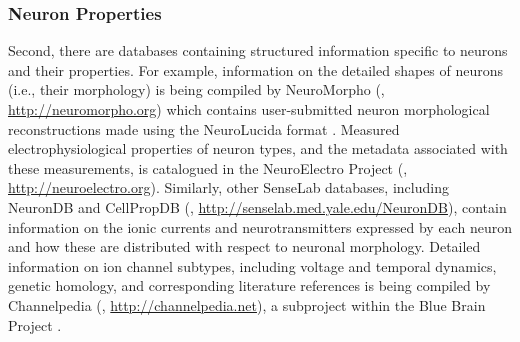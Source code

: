 \documentclass[12pt]{article}
\begin{document}
\subsubsection*{Neuron Properties}
Second, there are databases containing structured information specific to neurons and their properties. 
For example, information on the detailed shapes of neurons (i.e., their morphology) is being compiled by NeuroMorpho (\cite{neuromorpho_2007}, \url{http://neuromorpho.org}) which contains user-submitted neuron morphological reconstructions made using the NeuroLucida format \cite{glaser_neuron_1990}. 
Measured electrophysiological properties of neuron types, and the metadata associated with these measurements, is catalogued in the NeuroElectro Project (\cite{neuroelectro_2013}, \url{http://neuroelectro.org}).  
Similarly, other SenseLab databases, including NeuronDB and CellPropDB (\cite{crasto_senselab:_2007}, \url{http://senselab.med.yale.edu/NeuronDB}), contain information on the ionic currents and neurotransmitters expressed by each neuron and how these are distributed with respect to neuronal morphology. 
Detailed information on ion channel subtypes, including voltage and temporal dynamics, genetic homology, and corresponding literature references is being compiled by Channelpedia (\cite{ranjan_channelpedia:_2011}, \url{http://channelpedia.net}), a subproject within the Blue Brain Project \citep{markram_blue_2006}. 
\end{document}
